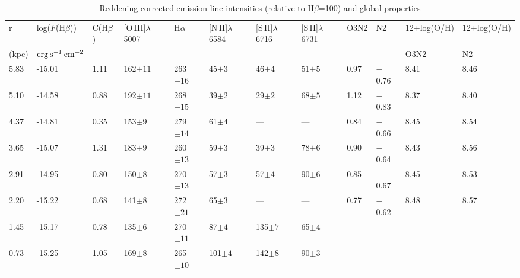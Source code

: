 \documentclass[useAMS,usenatbib]{mn2e}
\begin{document}
\begin{table}
\centering
\centering
\caption{Reddening corrected emission line intensities (relative to
H$\beta$=100) and global  properties}
\begin{tabular}{llllllllllll}
 \hline 
\noalign{\smallskip}
\hline
\noalign{\smallskip}
 r    & log($F$(H$\beta$))        & C(H$\beta$)                  &
[O\,III]$\lambda$5007 &   H$\alpha$   &    [N\,II]$\lambda$6584 &
[S\,II]$\lambda$6716 & [S\,II]$\lambda$6731 &  O3N2 &
 N2  & 12+log(O/H)     &    12+log(O/H)   \\
    (kpc)             &          $\rm erg\:s^{-1}\:cm^{-2}$       &             
                    &                     &                                    &
                                &                    &     &  && O3N2 &    N2  
\\
\noalign{\smallskip}
 \hline
 \noalign{\smallskip}
5.83  &    -15.01    &    1.11    &   162$\pm11$         &   263$\pm16$  &  
45$\pm3$      &  46$\pm4$       &   51$\pm5$    &     0.97       &    $-$0.76   
&     8.41  &    8.46     \\
5.10  &    -14.58    &   0.88     &   192$\pm11$ 	 &   268$\pm15$  &  
39$\pm2$      &  29$\pm2$       &   68$\pm5$    &     1.12       &    $-$0.83   
&     8.37  &    8.40    \\
4.37  &    -14.81    &   0.35     &   153$\pm9$ 	  &  279$\pm14$  &  
61$\pm4$      &  ---                  &   ---    &     0.84       &    $-$0.66  
 &     8.45  &    8.54      \\
3.65  &    -15.07    &   1.31     &   183$\pm9$ 	  &   260$\pm13$  &  
59$\pm3$      &  39$\pm3$      &  78$\pm6$    &    0.90        &    $-$0.64    &
    8.43  &    8.56    \\
2.91  &   -14.95   &    0.80    &    150$\pm8$	          &   270$\pm13$  &  
57$\pm3$      &   57$\pm4$     &   90$\pm6$   &     0.85       &    $-$0.67    &
    8.45  &     8.53   \\
2.20  &   -15.22   &    0.68    &    141$\pm8$ 	         &    272$\pm21$  &  
65$\pm3$      &   ---	           &   ---    &    0.77       &    $-$0.62    & 
   8.48  &     8.57     \\
1.45  &   -15.17   &    0.78    &    135$\pm6$ 	         &    270$\pm11$  &  
87$\pm4$      &  135$\pm7$   &    65$\pm4$   &    ---      &    ---    &     ---
&     --- \\
0.73  &   -15.25   &    1.05    &    169$\pm8$ 	         &    265$\pm10$  & 
101$\pm4$     &  142$\pm8$  &    90$\pm3$   &     ---     &    ---   &     --- 

\end{tabular}
\end{table}
\end{document}
